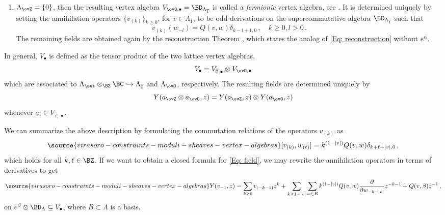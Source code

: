 \begin{definition}
\begin{enumerate}
\begin{multline}
\source{virasoro-constraints-moduli-sheaves-vertex-algebras}
Y\big(e^\alpha\otimes v^1_{-k_1-1}\cdots v^n_{-k_n-1},z\big)\\
= \frac{1}{k_1!k_2!\cdots k_n !}:Y(e^\alpha,z)\frac{d^{k_1}}{(dz)^{k_1}}Y(v^1_{-1},z)\cdots \frac{d^{k_n}}{(dz)^{k_n}}Y(v^n_{-1},z): \,.
\end{multline}
\item  $\Lambda_{\ovZ} = \{0\}$, then the resulting vertex algebra $V_{\ovO, \bullet}=\BD_{\Lambda_{\overline 1}}$ is called a \textit{fermionic} vertex algebra, see \cite[Section 3.6]{Ka98}. It is determined uniquely by setting the annihilation operators $\{v_{(k)}\}_{k\geq 0}$, for $v\in \Lambda_{\overline 1}$, to be odd derivations on the supercommutative algebra $\BD_{\Lambda_{\overline 1}}$ such that
$$
v_{(k)}(w_{-l}) =Q(v,w)\delta_{k-l+1,0}\,, \quad k\geq 0, l>0 \,.
$$
The remaining fields are obtained again by the reconstruction Theorem \cite[Theorem 4.5]{Ka98}, which states the analog of \eqref{Eq: reconstruction} without $e^\alpha$.
    \end{enumerate}
  In general, $V_\bullet$ is defined as the tensor product of the two lattice vertex algebras, \[V_\bullet=V_{\overline{0}, \bullet}\otimes V_{\ovO,\bullet} \]
   which are associated to $\Lambda_{\sst}\otimes_{\BZ}\BC\hookrightarrow \Lambda_{\overline 0}$ and $\Lambda_{\ovO}$, respectively. The resulting fields are determined uniquely by
$$
Y({a_{\ovZ}\otimes a_{\ovO}},z) = Y(a_{\ovZ},z)\otimes Y(a_{\ovO},z)
$$
whenever $a_{\overline{i}}\in V_{\,\overline{i},\,\bullet}$.
\end{definition}

We can summarize the above description by formulating the commutation relations of the operators $v_{(k)}$ as
\begin{equation}\label{lattice VOA commutation}
\source{virasoro-constraints-moduli-sheaves-vertex-algebras}
    [v_{(k)},w_{(\ell)}]=k^{(1-|v|)}Q(v,w)\delta_{k+\ell+|v|,0}\,,
\end{equation}
which holds for all $k,\ell\in \BZ$. If we want to obtain a closed formula for \eqref{Eq: field}, we may rewrite the annihilation operators in terms of derivatives to get
\begin{equation}
\label{Eq: explicitfield}
\source{virasoro-constraints-moduli-sheaves-vertex-algebras}
Y(v_{-1},z) = \sum_{k\geq0}v_{(-k-1)}z^{k} +\sum_{k\geq 1-|v|}\sum_{w\in B} k^{(1-|v|)} Q(v,w)\frac{\partial}{\partial w_{-k-|v|}}z^{-k-1} + Q(v,\beta)z^{-1}\,,
\end{equation}
on $e^\beta\otimes \BD_\Lambda\subseteq V_\bullet$, where $B\subset\Lambda$ is a basis.

